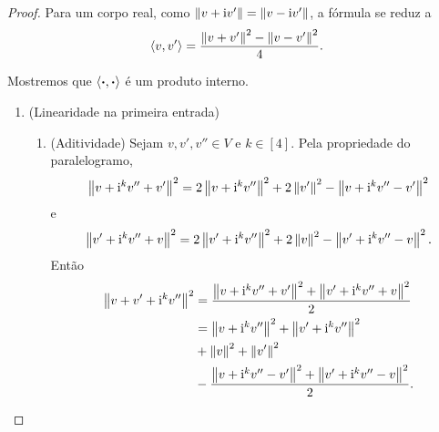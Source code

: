 \begin{proof}
Para um corpo real, como $\nor{v+\ii v'} = \nor{v-\ii v'}$, a fórmula se reduz a
	\begin{equation*}
	\inte{v}{v'} = \frac{\nor{v+v'}^2 - \nor{v-v'}^2}{4}.
	\end{equation*}

Mostremos que $\inte{\var}{\var}$ é um produto interno.
\begin{enumerate}
\item (Linearidade na primeira entrada)
	\begin{enumerate}
	\item (Aditividade) Sejam $v,v',v'' \in V$ e $k \in [4]$. Pela propriedade do paralelogramo,
		\begin{equation*}
		\nor{v+\ii^kv''+v'}^2 = 2\nor{v+\ii^kv''}^2 + 2\nor{v'}^2 - \nor{v+\ii^kv''-v'}^2
		\end{equation*}
		e
		\begin{equation*}
		\nor{v'+\ii^kv''+v}^2 = 2\nor{v'+\ii^kv''}^2 + 2\nor{v}^2 - \nor{v'+\ii^kv''-v}^2.
		\end{equation*}
	Então
		\begin{align*}
		\nor{v+v'+\ii^kv''}^2 &= \frac{\nor{v+\ii^kv''+v'}^2 + \nor{v'+\ii^kv''+v}^2}{2} \\
			&= \nor{v+\ii^kv''}^2 + \nor{v'+\ii^kv''}^2 \\
			&+ \nor{v}^2 + \nor{v'}^2 \\
			&- \frac{\nor{v+\ii^kv''-v'}^2 + \nor{v'+\ii^kv''-v}^2}{2}.
		\end{align*}


\end{enumerate}
\end{enumerate}
\end{proof}
